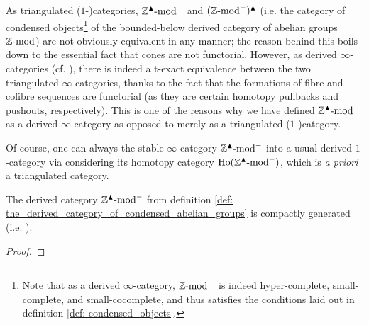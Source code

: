             \begin{remark} \label{remark: condensation_of_the_derived_category_of_abelian_groups}
                As triangulated ($1$-)categories, $\mathbb{Z}^{\blacktriangle}\text{-}\mathrm{mod}^-$ and $(\mathbb{Z}\text{-}\mathrm{mod}^-)^{\blacktriangle}$ (i.e. the category of condensed objects\footnote{Note that as a derived $\infty$-category, $\mathbb{Z}\text{-}\mathrm{mod}^-$ is indeed hyper-complete, small-complete, and small-cocomplete, and thus satisfies the conditions laid out in definition \ref{def: condensed_objects}.} of the bounded-below derived category of abelian groups $\mathbb{Z}\text{-}\mathrm{mod}$) are not obviously equivalent in any manner; the reason behind this boils down to the essential fact that cones are not functorial. However, as derived $\infty$-categories (cf. \cite[Subsection 1.3.2]{HA}), there is indeed a t-exact equivalence between the two triangulated $\infty$-categories, thanks to the fact that the formations of fibre and cofibre sequences are functorial (as they are certain homotopy pullbacks and pushouts, respectively). This is one of the reasons why we have defined $\mathbb{Z}^{\blacktriangle}\text{-}\mathrm{mod}$ as a derived $\infty$-category as opposed to merely as a triangulated ($1$-)category.
                
                Of course, one can always  the stable $\infty$-category $\mathbb{Z}^{\blacktriangle}\text{-}\mathrm{mod}^-$ into a usual derived $1$-category via considering its homotopy category $\mathrm{Ho}(\mathbb{Z}^{\blacktriangle}\text{-}\mathrm{mod}^-)$, which is \textit{a priori} a triangulated category. 
            \end{remark}
            \begin{proposition} \label{prop: the_derived_category_of_condensed_abelian_groups_is_compactly_generated}
                The derived category $\mathbb{Z}^{\blacktriangle}\text{-}\mathrm{mod}^-$ from definition \ref{def: the_derived_category_of_condensed_abelian_groups} is compactly generated (i.e. ).
            \end{proposition}
                \begin{proof}
                    
                \end{proof}
                
